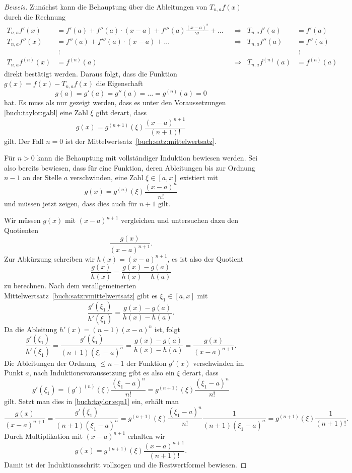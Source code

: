 \begin{proof}[Beweis]
Zunächst kann die Behauptung über die Ableitungen von $T_{n,a}f(x)$ durch
die Rechnung
\begin{align*}
T_{n,a}f'(x)
&=
f'(a) + f''(a) \cdot (x-a) + f'''(a)\frac{(x-a)^2}{2!} + \dots
&&\Rightarrow&
T_{n,a}f'(a) 
&=
f'(a)
\\
T_{n,a}f''(x)
&=
f''(a) + f'''(a) \cdot (x-a) + \dots
&&\Rightarrow&
T_{n,a}f''(a) 
&=
f''(a)
\\
&\;\vdots&&&&\;\vdots
\\
T_{n,a}f^{(n)}(x)
&=
f^{(n)}(a)
&&\Rightarrow&
T_{n,a}f^{(n)}(a)
&=
f^{(n)}(a)
\end{align*}
direkt bestätigt werden.
Daraus folgt, dass die Funktion $g(x) = f(x) - T_{n,a}f(x)$ die Eigenschaft
\begin{equation}
g(a) = g'(a) = g''(a) = \dots = g^{(n)}(a)=0
\label{buch:taylor:gabl}
\end{equation}
hat.
Es muss als nur gezeigt werden, dass es unter den Voraussetzungen
\eqref{buch:taylor:gabl} eine Zahl $\xi$ gibt derart, dass
\[
g(x) = g^{(n+1)}(\xi)\frac{(x-a)^{n+1}}{(n+1)!}
\]
gilt.
Der Fall $n=0$ ist der Mittelwertsatz~\ref{buch:satz:mittelwertsatz}.

Für $n>0$ kann die Behauptung mit vollständiger Induktion bewiesen werden.
Sei also bereits bewiesen, dass für eine Funktion, deren Ableitungen bis
zur Ordnung $n-1$ an der Stelle $a$ verschwinden, eine Zahl $\xi\in[a,x]$
existiert mit
\[
g(x) = g^{(n)}(\xi)\frac{(x-a)^n}{n!}
\]
und müssen jetzt zeigen, dass dies auch für $n+1$ gilt.

Wir müssen $g(x)$ mit $(x-a)^{n+1}$ vergleichen und untersuchen
dazu den Quotienten
\[
\frac{g(x)}{(x-a)^{n+1}}.
\]
Zur Abkürzung schreiben wir $h(x) = (x-a)^{n+1}$, es ist also der
Quotient 
\[
\frac{g(x)}{h(x)}
=
\frac{g(x)-g(a)}{h(x)-h(a)}
\]
zu berechnen.
Nach dem verallgemeinerten Mittelwertsatz~\ref{buch:satz:vmittelwertsatz}
gibt es $\xi_1\in[a,x]$ mit
\[
\frac{g'(\xi_1)}{h'(\xi_1)}
=
\frac{g(x)-g(a)}{h(x)-h(a)}.
\]
Da die Ableitung $h'(x)=(n+1)(x-a)^n$ ist, folgt
\begin{equation}
\frac{g'(\xi_1)}{h'(\xi_1)}
=
\frac{g'(\xi_1)}{(n+1) (\xi_1-a)^n}
=
\frac{g(x)-g(a)}{h(x)-h(a)}
=
\frac{g(x)}{(x-a)^{n+1}}.
\label{buch:taylor:eqn1}
\end{equation}
Die Ableitungen der Ordnung $\le n-1$ der Funktion $g'(x)$ verschwinden
im Punkt $a$, nach Induktionsvoraussetzung gibt es also ein $\xi$ derart,
dass
\[
g'(\xi_1)
=
(g')^{(n)}(\xi) \frac{(\xi_1-a)^{n}}{n!}
=
g^{(n+1)}(\xi)\frac{(\xi_1-a)^n}{n!}
\]
gilt.
Setzt man dies in \eqref{buch:taylor:eqn1} ein, erhält man
\[
\frac{g(x)}{(x-a)^{n+1}}
=
\frac{g'(\xi_1)}{(n+1)(\xi_1-a)^n}
=
g^{(n+1)}(\xi)\frac{(\xi_1-a)^n}{n!} \frac{1}{(n+1)(\xi_1-a)^n}
=
g^{(n+1)}(\xi)\frac{1}{(n+1)!}.
\]
Durch Multiplikation mit $(x-a)^{n+1}$ erhalten wir
\[
g(x) = g^{(n+1)}(\xi)\frac{(x-a)^{n+1}}{(n+1)!}.
\]
Damit ist der Induktionsschritt vollzogen und die Restwertformel bewiesen.
\end{proof}

